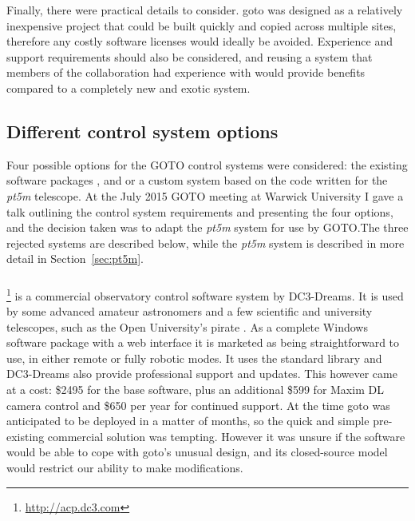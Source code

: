 \begin{colsection}
\begin{colsection}
Finally, there were practical details to consider. \gls{goto} was designed as a relatively inexpensive project that could be built quickly and copied across multiple sites, therefore any costly software licenses would ideally be avoided. Experience and support requirements should also be considered, and reusing a system that members of the collaboration had experience with would provide benefits compared to a completely new and exotic system.

\end{colsection}


\subsection{Different control system options}
\label{sec:control_options}
\begin{colsection}

Four possible options for the GOTO control systems were considered: the existing software packages ,  and  or a custom system based on the code written for the \textit{pt5m} telescope. At the July 2015 GOTO meeting at Warwick University I gave a talk outlining the control system requirements and presenting the four options, and the decision taken was to adapt the \textit{pt5m} system for use by GOTO.\@ The three rejected systems are described below, while the \textit{pt5m} system is described in more detail in Section~\ref{sec:pt5m}.

\subsubsection{}
\footnote{\url{http://acp.dc3.com}} is a commercial observatory control software system by DC3-Dreams. It is used by some advanced amateur astronomers and a few scientific and university telescopes, such as the Open University's \gls{pirate} \citep{PIRATE}. As a complete Windows software package with a web interface it is marketed as being straightforward to use, in either remote or fully robotic modes. It uses the  standard library and DC3-Dreams also provide professional support and updates. This however came at a cost: \$2495 for the base software, plus an additional \$599 for Maxim DL camera control and \$650 per year for continued support. At the time \gls{goto} was anticipated to be deployed in a matter of months, so the quick and simple pre-existing commercial solution was tempting. However it was unsure if the  software would be able to cope with \gls{goto}'s unusual design, and its closed-source model would restrict our ability to make modifications.


\end{colsection}
\end{colsection}
